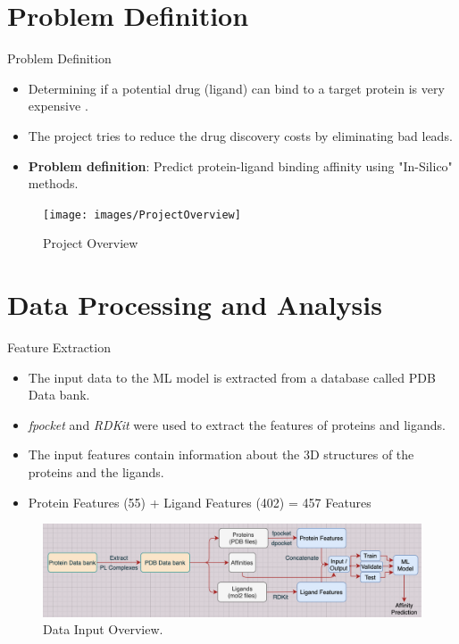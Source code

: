 \documentclass{beamer}
\begin{document}
\section{Problem Definition}

\begin{frame}[t]{Problem Definition}

\begin{itemize}
\item Determining if a potential drug (ligand) can bind to a target protein is very expensive \cite{drugdiscoverycost}.
\item The project tries to reduce the drug discovery costs by eliminating bad leads.
\item \textbf{Problem definition}: Predict protein-ligand binding affinity using "In-Silico" methods. 
\end{itemize}

\begin{figure}[htb]
  \centering
    \texttt{[image: images/ProjectOverview]}
    \caption{Project Overview}
    \label{fig:ProjectOverviewImage}
\end{figure}

\end{frame}

\section{Data Processing and Analysis}

\begin{frame}[t]{Feature Extraction}

\begin{itemize}
\item The input data to the ML model is extracted from a database called PDB Data bank.
\item \textit{fpocket} and \textit{RDKit} were used to extract the features of proteins and ligands.
\item The input features contain information about the 3D structures of the proteins and the ligands.
\item Protein Features (55) + Ligand Features (402) = 457 Features
\end{itemize}

\begin{figure}[htb]
  \centering
    \includegraphics[scale=0.36]{images/DataInputOverview}
    \caption{Data Input Overview.}
    \label{fig:projectoverviewimage}
\end{figure}


\end{frame}
\end{document}
